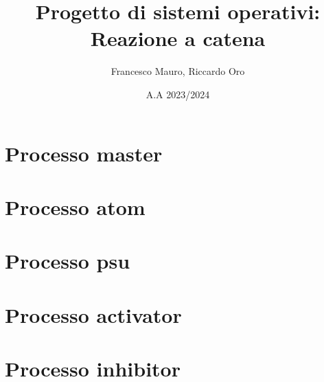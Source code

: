 \documentclass{article}
\title{Progetto di sistemi operativi: Reazione a catena}
\author{Francesco Mauro, Riccardo Oro}
\date{A.A 2023/2024}
\begin{document}
\maketitle
\tableofcontents

\section{Processo master}


\section{Processo atom}


\section{Processo psu}


\section{Processo activator}


\section{Processo inhibitor}

\end{document}
